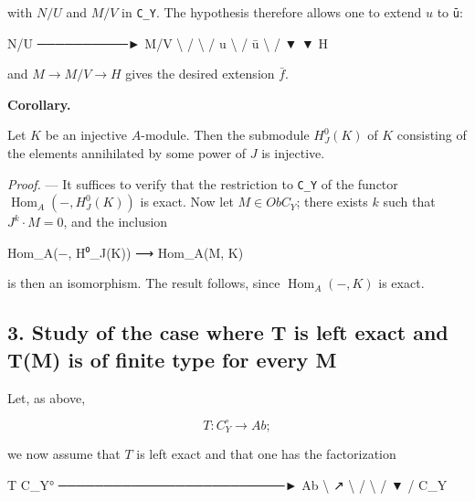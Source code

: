 \documentclass[
]{article}
\newenvironment{Shaded}{}{}
\newcommand{\NormalTok}[1]{#1}
\begin{document}
with \(N/U\) and \(M/V\) in \texttt{C\_Y}. The hypothesis therefore
allows one to extend \(u\) to \texttt{ū}:

\begin{Shaded}
\begin{Highlighting}[]
\NormalTok{N/U ──────────► M/V}
\NormalTok{   \textbackslash{}           /}
\NormalTok{    \textbackslash{}         /}
\NormalTok{   u \textbackslash{}       / ū}
\NormalTok{      \textbackslash{}     /}
\NormalTok{       ▼   ▼}
\NormalTok{         H}
\end{Highlighting}
\end{Shaded}

and \(M \to M/V \to H\) gives the desired extension \(\bar{f}\).

\textbf{Corollary.}

Let \(K\) be an injective \(A\)-module. Then the submodule
\(H^{0}_{J}(K)\) of \(K\) consisting of the elements annihilated by some
power of \(J\) is injective.

\emph{Proof.} --- It suffices to verify that the restriction to
\texttt{C\_Y} of the functor \(\operatorname{Hom}_{A}(-, H^{0}_{J}(K))\)
is exact. Now let \(M \in Ob C_{Y}\); there exists \(k\) such that
\(J^{k} \cdot M = 0\), and the inclusion

\begin{Shaded}
\begin{Highlighting}[]
\NormalTok{Hom\_A(−, H⁰\_J(K)) ⟶ Hom\_A(M, K)}
\end{Highlighting}
\end{Shaded}

is then an isomorphism. The result follows, since
\(\operatorname{Hom}_{A}(-, K)\) is exact.

\subsection{3. Study of the case where T is left exact and T(M) is of
finite type for every
M}\label{study-of-the-case-where-t-is-left-exact-and-tm-is-of-finite-type-for-every-m}

Let, as above,

\[
T : C^{\circ}_{Y} \longrightarrow Ab;
\]

we now assume that \(T\) is left exact and that one has the
factorization

\begin{Shaded}
\begin{Highlighting}[]
\NormalTok{                         T}
\NormalTok{        C\_Y°  ─────────────────────────►  Ab}
\NormalTok{            \textbackslash{}                          ↗}
\NormalTok{             \textbackslash{}                       /}
\NormalTok{              \textbackslash{}                    /}
\NormalTok{               ▼                 /}
\NormalTok{                    C\_Y}
\end{Highlighting}
\end{Shaded}
\end{document}
